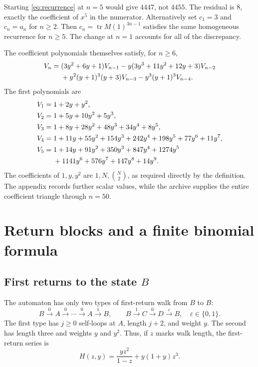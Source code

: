 \documentclass[11pt,a4paper]{article}
\theoremstyle{definition}
\newcommand{\tr}{\operatorname{tr}}
\newcommand{\bits}{\{0,1\}}
\newcommand{\eps}{\varepsilon}
\begin{document}
Starting \cref{eq:recurrence} at $n=5$ would give $4447$, not $4455$.
The residual is $8$, exactly the coefficient of $x^5$ in the numerator.
Alternatively set $c_1=3$ and $c_n=a_n$ for $n\ge2$. Then
$c_n=\tr M(1)^{3n-1}$ satisfies the same homogeneous recurrence for $n\ge5$.
The change at $n=1$ accounts for all of the discrepancy.

The coefficient polynomials themselves satisfy, for $n\ge6$,
\begin{align}
 V_n={}&(3y^2+6y+1)V_{n-1}
 -y(3y^3+11y^2+12y+3)V_{n-2}\notag\\
 &+y^2(y+1)^3(y+3)V_{n-3}-y^3(y+1)^3V_{n-4}.
 \label{eq:polyrec}
\end{align}
The first polynomials are
\begin{align*}
V_1={}&1+2y+y^2,\\
V_2={}&1+5y+10y^2+5y^3,\\
V_3={}&1+8y+28y^2+48y^3+34y^4+8y^5,\\
V_4={}&1+11y+55y^2+154y^3+242y^4+198y^5+77y^6+11y^7,\\
V_5={}&1+14y+91y^2+350y^3+847y^4+1274y^5\notag\\
 &+1141y^6+576y^7+147y^8+14y^9.
\end{align*}
The coefficients of $1,y,y^2$ are $1,N,\binom N2$, as required directly by
the definition. The appendix records further scalar values, while the
archive supplies the entire coefficient triangle through $n=50$.

\section{Return blocks and a finite binomial formula}
\label{sec:blocks}

\subsection{First returns to the state \texorpdfstring{$B$}{B}}

The automaton has only two types of first-return walk from $B$ to $B$:
\begin{equation}
 B\xrightarrow{0}A\xrightarrow{0}\cdots\xrightarrow{0}A
 \xrightarrow{1}B,
 \qquad
 B\xrightarrow{1}C\xrightarrow{0}D\xrightarrow{\eps}B,
 \quad\eps\in\bits.
 \label{eq:blocks}
\end{equation}
The first type has $j\ge0$ self-loops at $A$, length $j+2$, and weight $y$.
The second has length three and weights $y$ and $y^2$. Thus, if $z$ marks
walk length, the first-return series is
\begin{equation}
 H(z,y)=\frac{yz^2}{1-z}+y(1+y)z^3.
 \label{eq:H}
\end{equation}
\end{document}
